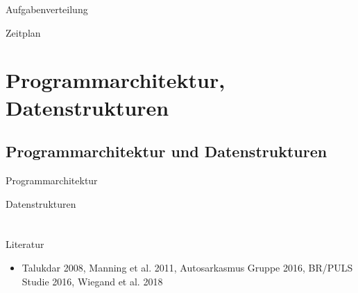 \documentclass{beamer}
\begin{document}
\begin{frame}{Aufgabenverteilung}
\end{frame}

\begin{frame}{Zeitplan}
\end{frame}

\section{Programmarchitektur, Datenstrukturen}
\subsection[Programmarchitektur]{ Programmarchitektur und Datenstrukturen }

\begin{frame}{Programmarchitektur}
\end{frame}

\begin{frame}{Datenstrukturen}
\end{frame}

\section{}
\subsection[]{}



\begin{frame}{Literatur}
\begin{itemize}
\item Talukdar 2008, Manning et al. 2011, Autosarkasmus Gruppe 2016, BR/PULS Studie 2016, Wiegand et al. 2018
\end{itemize}
\end{frame}
\end{document}
